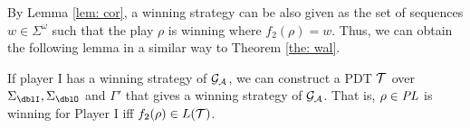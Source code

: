 By Lemma \ref{lem: cor},
a winning strategy can be also given as
the set of sequences $w\in\Sigma^\omega$
such that the play $\rho$ is winning where $f_2(\rho)=w$.
Thus, we can obtain the following lemma
in a similar way to Theorem \ref{the: wal}.
\begin{lemma}
\label{lem: 2}
If player I has a winning strategy of ${\cal G}_{\cal A}$,
we can construct a PDT ${\cal T}$ over $\Sigma_\dblI, \Sigma_\dblO$ and $\Gamma'$ that gives a winning strategy of ${\cal G}_{\cal A}$.
That is, $\rho\in \mathit{PL}$ is winning for Player I iff $f_2(\rho)\in L({\cal T})$.
\end{lemma}

